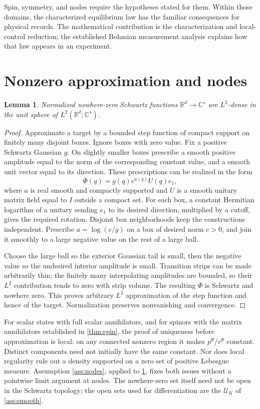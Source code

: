 \documentclass[11pt]{article}
\numberwithin{equation}{section}
\newtheorem{lemma}[lemma]{Lemma}
\theoremstyle{definition}
\newcommand{\R}{\mathbb R}
\newcommand{\C}{\mathbb C}
\begin{document}
Spin, symmetry, and nodes require the hypotheses stated for them. Within those domains, the characterized equilibrium law has the familiar consequences for physical records. The mathematical contribution is the characterization and local-control reduction; the established Bohmian measurement analysis explains how that law appears in an experiment.

\appendix
\section{Nonzero approximation and nodes}\label{app:nodes}

\begin{lemma}\label{lem:nodal-density}
Normalized nowhere-zero Schwartz functions \(\R^d\to\C^s\) are \(L^2\)-dense in the unit sphere of \(L^2(\R^d;\C^s)\).
\end{lemma}

\begin{proof}
Approximate a target by a bounded step function of compact support on finitely many disjoint boxes. Ignore boxes with zero value. Fix a positive Schwartz Gaussian \(g\). On slightly smaller boxes prescribe a smooth positive amplitude equal to the norm of the corresponding constant value, and a smooth unit vector equal to its direction. These prescriptions can be realized in the form
\[
 \Phi(q)=g(q)e^{a(q)}U(q)e_1,
\]
where \(a\) is real smooth and compactly supported and \(U\) is a smooth unitary matrix field equal to \(I\) outside a compact set. For each box, a constant Hermitian logarithm of a unitary sending \(e_1\) to its desired direction, multiplied by a cutoff, gives the required rotation. Disjoint box neighborhoods keep the constructions independent. Prescribe \(a=\log(c/g)\) on a box of desired norm \(c>0\), and join it smoothly to a large negative value on the rest of a large ball.

Choose the large ball so the exterior Gaussian tail is small, then the negative value so the undesired interior amplitude is small. Transition strips can be made arbitrarily thin; the finitely many interpolating amplitudes are bounded, so their \(L^2\) contribution tends to zero with strip volume. The resulting \(\Phi\) is Schwartz and nowhere zero. This proves arbitrary \(L^2\) approximation of the step function and hence of the target. Normalization preserves nonvanishing and convergence.
\end{proof}

For scalar states with full scalar annihilators, and for spinors with the matrix annihilators established in \cref{thm:spin}, the proof of uniqueness before approximation is local: on any connected nonzero region it makes \(p^\Psi/r^\Psi\) constant. Distinct components need not initially have the same constant. Nor does local regularity rule out a density supported on a zero set of positive Lebesgue measure. Assumption \ref{ass:nodes}, applied to \cref{lem:nodal-density}, fixes both issues without a pointwise limit argument at nodes. The nowhere-zero set itself need not be open in the Schwartz topology; the open sets used for differentiation are the \(\mathscr U_K\) of \ref{ass:smooth}.
\end{document}
